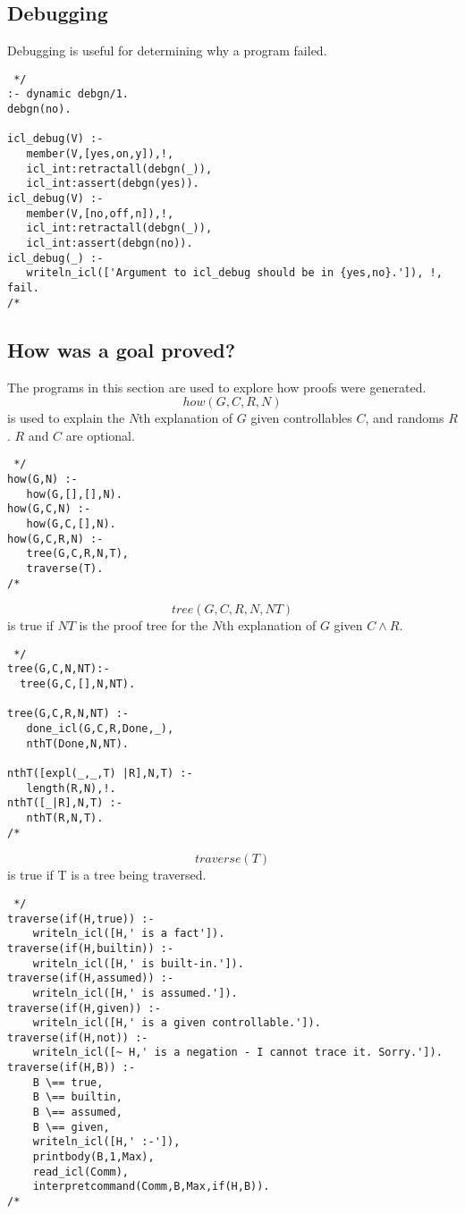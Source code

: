\documentclass[11pt,fleqn]{article}
\begin{document}
\subsection{Debugging}
Debugging is useful for determining why a program failed.
\begin{verbatim} */
:- dynamic debgn/1.
debgn(no).

icl_debug(V) :-
   member(V,[yes,on,y]),!,
   icl_int:retractall(debgn(_)),
   icl_int:assert(debgn(yes)).
icl_debug(V) :-
   member(V,[no,off,n]),!,
   icl_int:retractall(debgn(_)),
   icl_int:assert(debgn(no)).
icl_debug(_) :-
   writeln_icl(['Argument to icl_debug should be in {yes,no}.']), !, fail.
/* \end{verbatim}

\subsection{How was a goal proved?}
The programs in this section are used to explore how proofs were generated.
\[how(G,C,R,N)\]
is used to explain the $N$th explanation of $G$ given controllables
$C$, and randoms $R$. $R$ and $C$ are optional.

\begin{verbatim} */
how(G,N) :-
   how(G,[],[],N).
how(G,C,N) :-
   how(G,C,[],N).
how(G,C,R,N) :-
   tree(G,C,R,N,T),
   traverse(T).
/* \end{verbatim}

\[tree(G,C,R,N,NT)\]
is true if $NT$ is the proof tree for the $N$th explanation of $G$ given $C\wedge R$.

\begin{verbatim} */
tree(G,C,N,NT):- 
  tree(G,C,[],N,NT).

tree(G,C,R,N,NT) :-
   done_icl(G,C,R,Done,_),
   nthT(Done,N,NT).

nthT([expl(_,_,T) |R],N,T) :-
   length(R,N),!.
nthT([_|R],N,T) :-
   nthT(R,N,T).
/* \end{verbatim}

\[traverse(T)\] 
is true if T is a tree being traversed.
\begin{verbatim} */
traverse(if(H,true)) :-
    writeln_icl([H,' is a fact']).
traverse(if(H,builtin)) :-
    writeln_icl([H,' is built-in.']).
traverse(if(H,assumed)) :-
    writeln_icl([H,' is assumed.']).
traverse(if(H,given)) :-
    writeln_icl([H,' is a given controllable.']).
traverse(if(H,not)) :-
    writeln_icl([~ H,' is a negation - I cannot trace it. Sorry.']).
traverse(if(H,B)) :-
    B \== true,
    B \== builtin,
    B \== assumed,
    B \== given,
    writeln_icl([H,' :-']),
    printbody(B,1,Max),
    read_icl(Comm),
    interpretcommand(Comm,B,Max,if(H,B)).
/* \end{verbatim}
\end{document}
